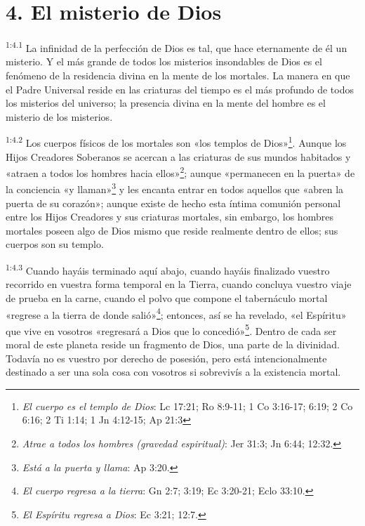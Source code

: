 \section*{4. El misterio de Dios}
\par
\textsuperscript{1:4.1} La infinidad de la perfección de Dios es tal, que hace eternamente de él un misterio. Y el más grande de todos los misterios insondables de Dios es el fenómeno de la residencia divina en la mente de los mortales. La manera en que el Padre Universal reside en las criaturas del tiempo es el más profundo de todos los misterios del universo; la presencia divina en la mente del hombre es el misterio de los misterios.

\par
\textsuperscript{1:4.2} Los cuerpos físicos de los mortales son «los templos de Dios»\footnote{\textit{El cuerpo es el templo de Dios}: Lc 17:21; Ro 8:9-11; 1 Co 3:16-17; 6:19; 2 Co 6:16; 2 Ti 1:14; 1 Jn 4:12-15; Ap 21:3}. Aunque los Hijos Creadores Soberanos se acercan a las criaturas de sus mundos habitados y «atraen a todos los hombres hacia ellos»\footnote{\textit{Atrae a todos los hombres (gravedad espiritual)}: Jer 31:3; Jn 6:44; 12:32.}; aunque «permanecen en la puerta» de la conciencia «y llaman»\footnote{\textit{Está a la puerta y llama}: Ap 3:20.} y les encanta entrar en todos aquellos que «abren la puerta de su corazón»; aunque existe de hecho esta íntima comunión personal entre los Hijos Creadores y sus criaturas mortales, sin embargo, los hombres mortales poseen algo de Dios mismo que reside realmente dentro de ellos; sus cuerpos son su templo.

\par
\textsuperscript{1:4.3} Cuando hayáis terminado aquí abajo, cuando hayáis finalizado vuestro recorrido en vuestra forma temporal en la Tierra, cuando concluya vuestro viaje de prueba en la carne, cuando el polvo que compone el tabernáculo mortal «regrese a la tierra de donde salió»\footnote{\textit{El cuerpo regresa a la tierra}: Gn 2:7; 3:19; Ec 3:20-21; Eclo 33:10.}; entonces, así se ha revelado, «el Espíritu» que vive en vosotros «regresará a Dios que lo concedió»\footnote{\textit{El Espíritu regresa a Dios}: Ec 3:21; 12:7.}. Dentro de cada ser moral de este planeta reside un fragmento de Dios, una parte de la divinidad. Todavía no es vuestro por derecho de posesión, pero está intencionalmente destinado a ser una sola cosa con vosotros si sobrevivís a la existencia mortal.

